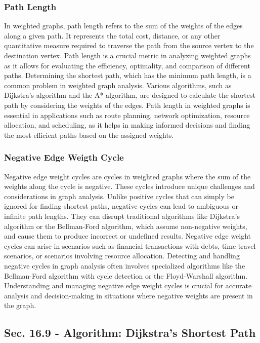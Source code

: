 \subsubsection{Path Length}

In weighted graphs, path length refers to the sum of the weights of the edges along a given path. It represents the total cost, distance, or any other quantitative measure required to traverse the path from the 
source vertex to the destination vertex. Path length is a crucial metric in analyzing weighted graphs as it allows for evaluating the efficiency, optimality, and comparison of different paths. Determining the 
shortest path, which has the minimum path length, is a common problem in weighted graph analysis. Various algorithms, such as Dijkstra's algorithm and the A* algorithm, are designed to calculate the shortest path 
by considering the weights of the edges. Path length in weighted graphs is essential in applications such as route planning, network optimization, resource allocation, and scheduling, as it helps in making informed 
decisions and finding the most efficient paths based on the assigned weights.

\subsubsection{Negative Edge Weigth Cycle}

Negative edge weight cycles are cycles in weighted graphs where the sum of the weights along the cycle is negative. These cycles introduce unique challenges and considerations in graph analysis. Unlike positive cycles 
that can simply be ignored for finding shortest paths, negative cycles can lead to ambiguous or infinite path lengths. They can disrupt traditional algorithms like Dijkstra's algorithm or the Bellman-Ford algorithm, 
which assume non-negative weights, and cause them to produce incorrect or undefined results. Negative edge weight cycles can arise in scenarios such as financial transactions with debts, time-travel scenarios, or scenarios 
involving resource allocation. Detecting and handling negative cycles in graph analysis often involves specialized algorithms like the Bellman-Ford algorithm with cycle detection or the Floyd-Warshall algorithm. Understanding 
and managing negative edge weight cycles is crucial for accurate analysis and decision-making in situations where negative weights are present in the graph.

\subsection*{Sec. 16.9 - Algorithm: Dijkstra's Shortest Path}

